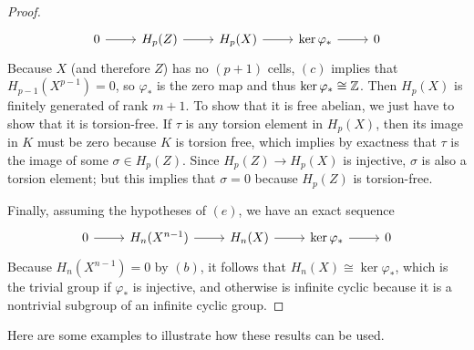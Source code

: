\begin{proof}
\[\begin{tikzcd}
0\ar[r]&H_p(Z)\ar[r]&H_p(X)\ar[r]&\ker\varphi_*\ar[r]&0
\end{tikzcd}\]
Because $X$ (and therefore $Z$) has no $(p+1)$ cells, $(c)$ implies that $H_{p-1}(X^{p-1})=0$, so $\varphi_*$ is the zero map and thus $\mathrm{ker}\,\varphi_*\cong\mathbb{Z}$. Then 
$H_p(X)$ is finitely generated of rank $m+1$. To show that it is free abelian, we just have to show that it is torsion-free. If $\tau$ is any torsion element in 
$H_p(X)$, then its image in $K$ must be zero because $K$ is torsion free, which implies by exactness that $\tau$ is the image of some $\sigma\in H_p(Z)$. Since 
$H_p(Z)\to H_p(X)$ is injective, $\sigma$ is also a torsion element; but this implies that $\sigma=0$ because $H_p(Z)$ is torsion-free.\par
Finally, assuming the hypotheses of $(e)$, we have an exact sequence
\[\begin{tikzcd}
0\ar[r]&H_n(X^{n-1})\ar[r]&H_n(X)\ar[r]&\ker\varphi_*\ar[r]&0
\end{tikzcd}\]
Because $H_n(X^{n-1})=0$ by $(b)$, it follows that $H_n(X)\cong\ker\varphi_*$, which is the trivial group if $\varphi_*$ is injective, and otherwise is infinite cyclic because it is a nontrivial subgroup of an infinite cyclic group.
\end{proof}
Here are some examples to illustrate how these results can be used.
